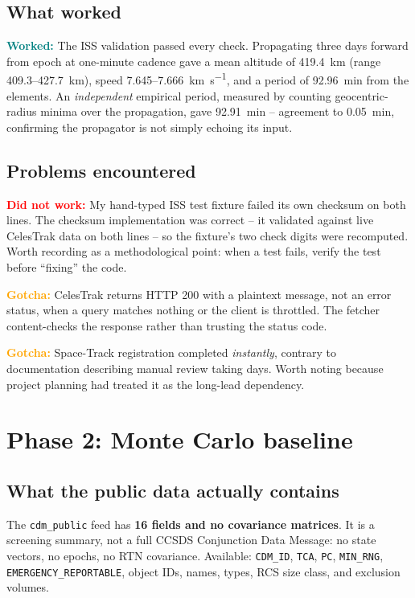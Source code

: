 \documentclass[11pt]{article}
\newcommand{\worked}[1]{\textcolor{teal}{\textbf{Worked:}} #1}
\newcommand{\failed}[1]{\textcolor{red}{\textbf{Did not work:}} #1}
\newcommand{\gotcha}[1]{\textcolor{orange}{\textbf{Gotcha:}} #1}
\begin{document}
\subsection{What worked}

\worked{The ISS validation passed every check. Propagating three days
forward from epoch at one-minute cadence gave a mean altitude of
\SI{419.4}{\kilo\meter} (range \num{409.3}--\SI{427.7}{\kilo\meter}),
speed \num{7.645}--\SI{7.666}{\kilo\meter\per\second}, and a period of
\SI{92.96}{\minute} from the elements. An \emph{independent} empirical
period, measured by counting geocentric-radius minima over the
propagation, gave \SI{92.91}{\minute} -- agreement to
\SI{0.05}{\minute}, confirming the propagator is not simply echoing its
input.}

\subsection{Problems encountered}

\failed{My hand-typed ISS test fixture failed its own checksum on both
lines. The checksum implementation was correct -- it validated against
live CelesTrak data on both lines -- so the fixture's two check digits
were recomputed. Worth recording as a methodological point: when a test
fails, verify the test before ``fixing'' the code.}

\gotcha{CelesTrak returns HTTP 200 with a plaintext message, not an error
status, when a query matches nothing or the client is throttled. The
fetcher content-checks the response rather than trusting the status code.}

\gotcha{Space-Track registration completed \emph{instantly}, contrary to
documentation describing manual review taking days. Worth noting because
project planning had treated it as the long-lead dependency.}

\section{Phase 2: Monte Carlo baseline}\label{sec:phase2}

\subsection{What the public data actually contains}

The \texttt{cdm\_public} feed has \textbf{16 fields and no covariance
matrices}. It is a screening summary, not a full CCSDS Conjunction Data
Message: no state vectors, no epochs, no RTN covariance. Available:
\texttt{CDM\_ID}, \texttt{TCA}, \texttt{PC}, \texttt{MIN\_RNG},
\texttt{EMERGENCY\_REPORTABLE}, object IDs, names, types, RCS size class,
and exclusion volumes.
\end{document}
